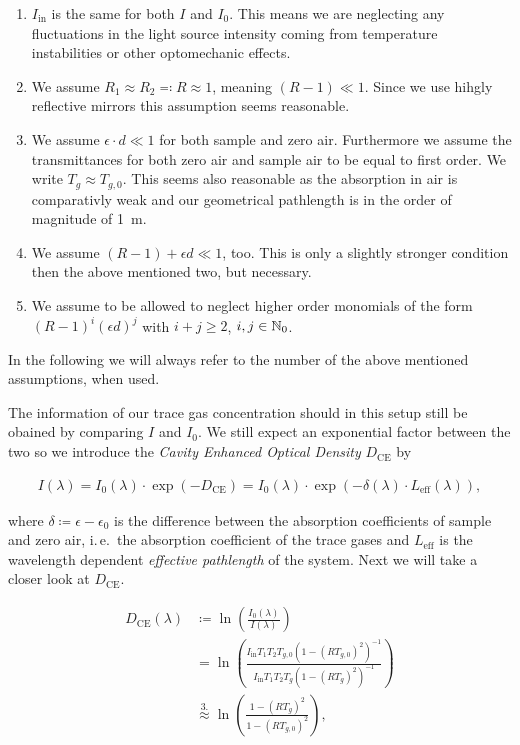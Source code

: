 \begin{enumerate}
\item $I_{\text{in}}$ is the same for both $I$ and $I_0$. This means
  we are neglecting any fluctuations in the light source intensity
  coming from temperature instabilities or other optomechanic effects.
\item We assume $R_1 \approx R_2 \eqqcolon R \approx 1$, meaning $(R -
  1) \ll 1$. Since we use hihgly reflective mirrors this assumption
  seems reasonable.
\item We assume $\epsilon \cdot d \ll 1$ for both sample and zero
  air. Furthermore we assume the transmittances for both zero air and
  sample air to be equal to first order. We write $T_g \approx
  T_{g,0}$. This seems also reasonable as the absorption in air is
  comparativly weak and our geometrical pathlength is in the order of
  magnitude of \SI{1}{\meter}.
\item We assume  $(R - 1) + \epsilon d \ll 1$, too. This is only a
  slightly stronger condition then the above mentioned two, but
  necessary. 
\item We assume to be allowed to neglect higher order monomials of the
  form $(R-1)^i(\epsilon d)^j$  with $i+j \geq 2$, $i,j \in \mathbb{N}_0$.
\end{enumerate}

In the following we will always refer to the number of the above
mentioned assumptions, when used.

The information of our trace gas concentration should in this setup
still be obained by comparing $I$ and $I_0$. We still expect an
exponential factor between the two so we introduce the \emph{Cavity
  Enhanced Optical Density} $D_{\text{CE}}$ by

\begin{align}
  I(\lambda) = I_0(\lambda) \cdot \exp(- D_{\text{CE}}) = I_0(\lambda)
  \cdot \exp(-\delta(\lambda) \cdot L_{\text{eff}}(\lambda)),
\end{align}

where $\delta \coloneqq \epsilon - \epsilon_0$ is the difference
between the absorption coefficients of sample and zero air, i.\,e.\ the
absorption coefficient of the trace gases and $L_{\text{eff}}$ is the
wavelength dependent \emph{effective pathlength} of the system. Next
we will take a closer look at $D_{\text{CE}}$.

\begin{align}
  D_{\text{CE}}(\lambda) & \coloneqq \ln\left(
                           \frac{I_0(\lambda)}{I(\lambda)}\right)\nonumber\\
                         & = \ln\left ( \frac{I_{\text{in}}T_1T_2T_{g,0}(1 -
                           (RT_{g,0})^2)^{-1}}{I_{\text{in}}T_1T_2T_g(1 -
                           (RT_g)^2)^{-1}}\right)\nonumber\\
                         & \stackrel{3.}{\approx} \ln\left( \frac{1 -
                           (RT_g)^2}{1 - (RT_{g,0})^2}\right)\label{eq:d_ce},
\end{align}

